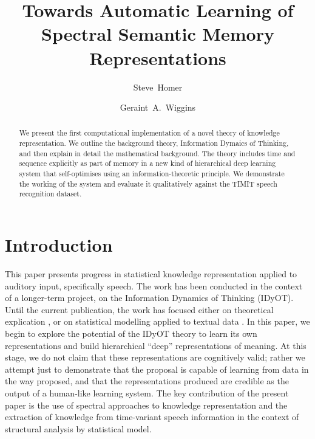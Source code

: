 \documentclass[runningheads]{llncs}
\begin{document}
%
\title{Towards Automatic Learning of\\Spectral Semantic Memory Representations}
%
%
\author{Steve~Homer \and
Geraint~A.~Wiggins}
%
%
%
\maketitle              %
%
\begin{abstract}
We present the first computational implementation of a novel theory of knowledge representation. We outline the background theory, Information Dymaics of Thinking, and then explain in detail the mathematical background. The theory includes time and sequence explicitly as part of memory in a new kind of hierarchical deep learning system that self-optimises using an information-theoretic principle. We demonstrate the working of the system and evaluate it qualitatively against the TIMIT speech recognition dataset.

\end{abstract}
%
%
%
\section{Introduction}
This paper presents progress in statistical knowledge representation applied to auditory input, specifically speech. The work has been conducted in the context of a longer-term project, on the Information Dynamics of Thinking (IDyOT). Until the current publication, the work has focused either on theoretical explication \cite{Wiggins12,WigginsForth15,ForthAgresEtAl16,vanderVeldeForthEtAl17,Wiggins18}, or on statistical modelling applied to textual data \cite{WigginsSanjekdar19}. In this paper, we begin to explore the potential of the IDyOT theory to learn its own representations and build hierarchical ``deep'' representations of meaning. At this stage, we do not claim that these representations are cognitively valid; rather we attempt just to demonstrate that the proposal is capable of learning from data in the way proposed, and that the representations produced are credible as the output of a human-like learning system. The key contribution of the present paper is the use of spectral approaches to knowledge representation and the extraction of knowledge from time-variant speech information in the context of structural analysis by statistical model.
\end{document}
